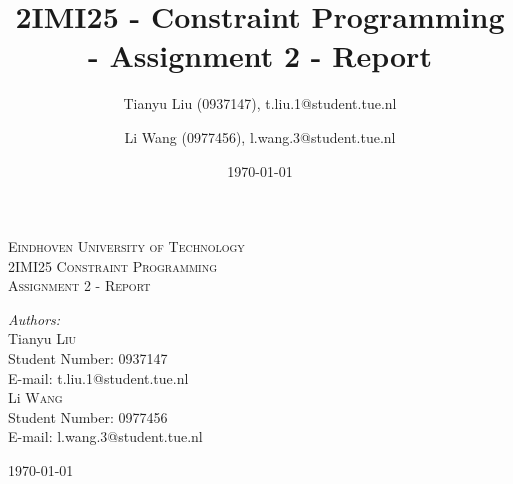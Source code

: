 \documentclass[a4paper, 12pt]{article}
\title{2IMI25 - Constraint Programming - Assignment 2 - Report}
\author{Tianyu Liu (0937147), t.liu.1@student.tue.nl \and Li Wang (0977456), l.wang.3@student.tue.nl}
\date{\today}
\begin{document}
\begin{titlepage}
	\newcommand{\HRule}{\rule{\linewidth}{0.5mm}} %
	\centering
	\textsc{\LARGE Eindhoven University of Technology}\\[1.5cm]
	\textsc{\Large 2IMI25 Constraint Programming}\\[1.5cm]
	\textsc{\large Assignment 2 - Report}\\[3cm]
	\begin{minipage}{0.4\textwidth}
		\begin{flushleft} \large
			\emph{Authors:}\\ [0.5cm]
			Tianyu \textsc{Liu}\\
			Student Number: 0937147\\
			E-mail: t.liu.1@student.tue.nl\\ [0.2cm]
			Li \textsc{Wang}\\
			Student Number: 0977456\\
			E-mail: l.wang.3@student.tue.nl\\ [0.2cm]
		\end{flushleft}
	\end{minipage}
	
	\vspace{15ex}
	{\large \today}\\[3cm] %
	\vfill
\end{titlepage}
\end{document}
